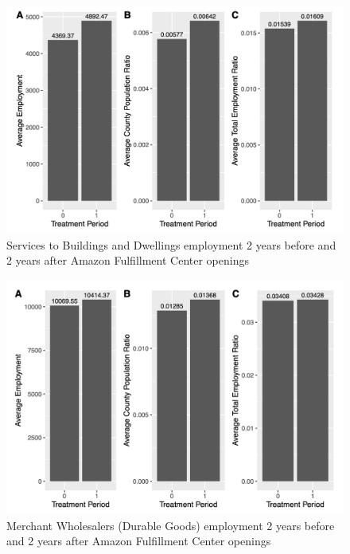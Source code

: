 \documentclass[11pt]{article}
\begin{document}
\begin{figure}[H]
\centering
\includegraphics[width=15cm]{SERVBUILD.png}
\caption{Services to Buildings and Dwellings employment 2 years before and 2 years after Amazon Fulfillment Center openings}
\end{figure}

\begin{figure}[H]
\centering
\includegraphics[width=15cm]{WHOLE.png}
\caption{Merchant Wholesalers (Durable Goods) employment 2 years before and 2 years after Amazon Fulfillment Center openings}
\end{figure}
\end{document}
